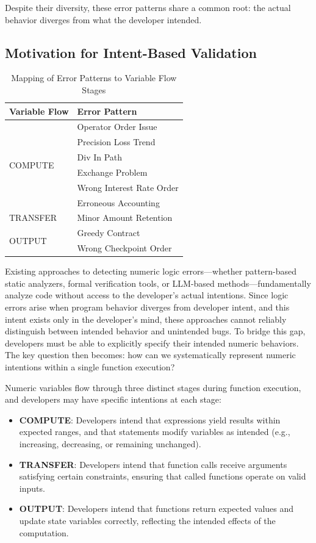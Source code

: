 \documentclass[pdflatex,sn-basic]{sn-jnl}%
\theoremstyle{thmstyleone}%
\theoremstyle{thmstyletwo}%
\theoremstyle{thmstylethree}%
\begin{document}
Despite their diversity, these error patterns share a common root: the actual behavior diverges from what the developer intended.

\subsection{Motivation for Intent-Based Validation}

\begin{table}[!t]
\centering
\caption{Mapping of Error Patterns to Variable Flow Stages}
\label{tab:error_mapping}
\begin{tabular}{|l|l|}
\hline
\textbf{Variable Flow} & \textbf{Error Pattern} \\
\hline
\multirow{6}{*}{COMPUTE}
& Operator Order Issue \\
& Precision Loss Trend \\
& Div In Path \\
& Exchange Problem \\
& Wrong Interest Rate Order \\
& Erroneous Accounting \\
\hline
TRANSFER & Minor Amount Retention \\
\hline
\multirow{2}{*}{OUTPUT}
& Greedy Contract \\
& Wrong Checkpoint Order \\
\hline
\end{tabular}
\end{table}

Existing approaches to detecting numeric logic errors---whether pattern-based static analyzers, formal verification tools, or LLM-based methods---fundamentally analyze code without access to the developer's actual intentions.
Since logic errors arise when program behavior diverges from developer intent, and this intent exists only in the developer's mind, these approaches cannot reliably distinguish between intended behavior and unintended bugs.
To bridge this gap, developers must be able to explicitly specify their intended numeric behaviors.
The key question then becomes: how can we systematically represent numeric intentions within a single function execution?

Numeric variables flow through three distinct stages during function execution, and developers may have specific intentions at each stage:

\begin{itemize}
    \item \textbf{COMPUTE}: Developers intend that expressions yield results within expected ranges, and that statements modify variables as intended (e.g., increasing, decreasing, or remaining unchanged).

    \item \textbf{TRANSFER}: Developers intend that function calls receive arguments satisfying certain constraints,
    ensuring that called functions operate on valid inputs.

    \item \textbf{OUTPUT}: Developers intend that functions return expected values and update state variables correctly,
    reflecting the intended effects of the computation.
\end{itemize}
\end{document}
